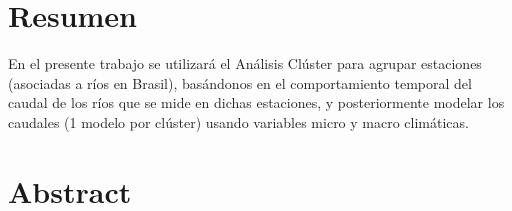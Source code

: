 \chapter*{Resumen}
{}

En el presente trabajo se utilizará el Análisis Clúster para agrupar estaciones (asociadas a ríos en Brasil), basándonos en el comportamiento temporal del caudal de los ríos que se mide en dichas estaciones, y posteriormente modelar los caudales (1 modelo por clúster) usando variables micro y macro climáticas.


\chapter*{Abstract}
{}
